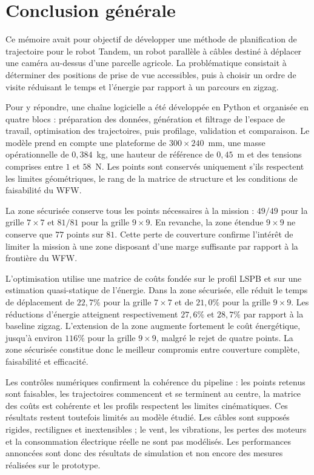 \chapter*{Conclusion générale}

Ce mémoire avait pour objectif de développer une méthode de planification de trajectoire pour le robot Tandem, un robot parallèle à câbles destiné à déplacer une caméra au-dessus d'une parcelle agricole. La problématique consistait à déterminer des positions de prise de vue accessibles, puis à choisir un ordre de visite réduisant le temps et l'énergie par rapport à un parcours en zigzag.

Pour y répondre, une chaîne logicielle a été développée en Python et organisée en quatre blocs : préparation des données, génération et filtrage de l'espace de travail, optimisation des trajectoires, puis profilage, validation et comparaison. Le modèle prend en compte une plateforme de $300\times240$~mm, une masse opérationnelle de $0{,}384$~kg, une hauteur de référence de $0{,}45$~m et des tensions comprises entre $1$ et $58$~N. Les points sont conservés uniquement s'ils respectent les limites géométriques, le rang de la matrice de structure et les conditions de faisabilité du WFW.

La zone sécurisée conserve tous les points nécessaires à la mission : $49/49$ pour la grille $7\times7$ et $81/81$ pour la grille $9\times9$. En revanche, la zone étendue $9\times9$ ne conserve que $77$ points sur $81$. Cette perte de couverture confirme l'intérêt de limiter la mission à une zone disposant d'une marge suffisante par rapport à la frontière du WFW.

L'optimisation utilise une matrice de coûts fondée sur le profil LSPB et sur une estimation quasi-statique de l'énergie. Dans la zone sécurisée, elle réduit le temps de déplacement de $22{,}7\%$ pour la grille $7\times7$ et de $21{,}0\%$ pour la grille $9\times9$. Les réductions d'énergie atteignent respectivement $27{,}6\%$ et $28{,}7\%$ par rapport à la baseline zigzag. L'extension de la zone augmente fortement le coût énergétique, jusqu'à environ $116\%$ pour la grille $9\times9$, malgré le rejet de quatre points. La zone sécurisée constitue donc le meilleur compromis entre couverture complète, faisabilité et efficacité.

Les contrôles numériques confirment la cohérence du pipeline : les points retenus sont faisables, les trajectoires commencent et se terminent au centre, la matrice des coûts est cohérente et les profils respectent les limites cinématiques. Ces résultats restent toutefois limités au modèle étudié. Les câbles sont supposés rigides, rectilignes et inextensibles ; le vent, les vibrations, les pertes des moteurs et la consommation électrique réelle ne sont pas modélisés. Les performances annoncées sont donc des résultats de simulation et non encore des mesures réalisées sur le prototype.

